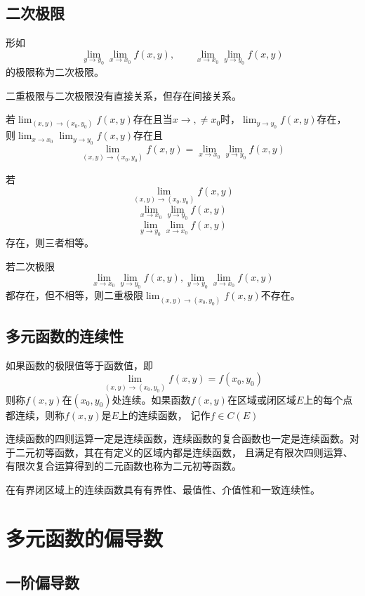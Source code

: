 \subsection{二次极限}
形如
\[ \lim_{y\to y_0} \lim_{x\to x_0}f(x,y),\qquad \lim_{x\to x_0}\lim_{y\to y_0}f(x,y) \]
的极限称为二次极限。

二重极限与二次极限没有直接关系，但存在间接关系。
\begin{theorem}
    若$\lim_{(x,y)\to(x_0,y_0)}f(x,y)$存在且当$x\to,\neq x_0$时，$\lim_{y\to y_0}f(x,y)$存在，
    则$\lim_{x\to x_0} \lim_{y\to y_0}f(x,y)$存在且
    \[ \lim_{(x,y)\to(x_0,y_0)}f(x,y) = \lim_{x\to x_0} \lim_{y\to y_0}f(x,y) \]
\end{theorem}

\begin{theorem}
    若
    \[\lim_{(x,y)\to(x_0,y_0)}f(x,y)\]
    \[\lim_{x\to x_0} \lim_{y\to y_0}f(x,y)\]
    \[\lim_{y\to y_0}\lim_{x\to x_0}f(x,y)\]
    存在，则三者相等。
\end{theorem}

\begin{theorem}
    若二次极限
    \[ \lim_{x\to x_0} \lim_{y\to y_0}f(x,y),\lim_{y\to y_0}\lim_{x\to x_0}f(x,y) \]
    都存在，但不相等，则二重极限$\lim_{(x,y)\to(x_0,y_0)}f(x,y)$不存在。
\end{theorem}

\subsection{多元函数的连续性}
如果函数的极限值等于函数值，即
\[ \lim_{(x,y)\to(x_0,y_0)} f(x,y) = f(x_0,y_0) \]
则称$f(x,y)$在$(x_0,y_0)$处连续。如果函数$f(x,y)$在区域或闭区域$E$上的每个点都连续，则称$f(x,y)$是$E$上的连续函数，
记作$f\in C(E)$

连续函数的四则运算一定是连续函数，连续函数的复合函数也一定是连续函数。对于二元初等函数，其在有定义的区域内都是连续函数，
且满足有限次四则运算、有限次复合运算得到的二元函数也称为二元初等函数。

在有界闭区域上的连续函数具有有界性、最值性、介值性和一致连续性。

\section{多元函数的偏导数}
\subsection{一阶偏导数}
